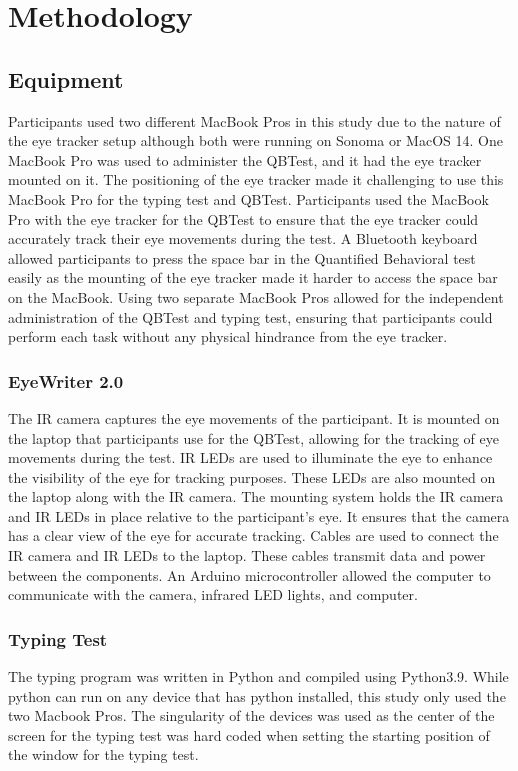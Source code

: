 \documentclass[manuscript, screen, review]{acmart} %
\begin{document}
\section{Methodology}
\subsection[short]{Equipment} 
Participants used two different MacBook Pros in this study due to the nature of the eye tracker setup although both were running on Sonoma or MacOS 14. One MacBook Pro was used to administer the QBTest, and it had the eye tracker mounted on it. The positioning of the eye tracker made it challenging to use this MacBook Pro for the typing test and QBTest. 
Participants used the MacBook Pro with the eye tracker for the QBTest to ensure that the eye tracker could accurately track their eye movements during the test. 
A Bluetooth keyboard allowed participants to press the space bar in the Quantified Behavioral test easily as the mounting of the eye tracker made it harder to access
the space bar on the MacBook.
Using two separate MacBook Pros allowed for the independent administration of the QBTest and typing test, ensuring that participants could perform each task without any physical hindrance from the eye tracker.

\subsubsection{EyeWriter 2.0}
The IR camera captures the eye movements of the participant.
It is mounted on the laptop that participants use for the QBTest, allowing for the tracking of eye movements during the test.
IR LEDs are used to illuminate the eye to enhance the visibility of the eye for tracking purposes. 
These LEDs are also mounted on the laptop along with the IR camera. 
The mounting system holds the IR camera and IR LEDs in place relative to the participant's eye. 
It ensures that the camera has a clear view of the eye for accurate tracking. 
Cables are used to connect the IR camera and IR LEDs to the laptop. These cables transmit data and power between the components.
An Arduino microcontroller allowed the computer to communicate with the camera, infrared LED lights, and computer.

\subsubsection{Typing Test}
The typing program was written in Python and compiled using Python3.9. 
While python can run on any device that has python installed, this study only used the two Macbook Pros. 
The singularity of the devices was used as the center of the screen for the typing test was hard coded when setting the starting position of the window for the typing test. 
\end{document}
